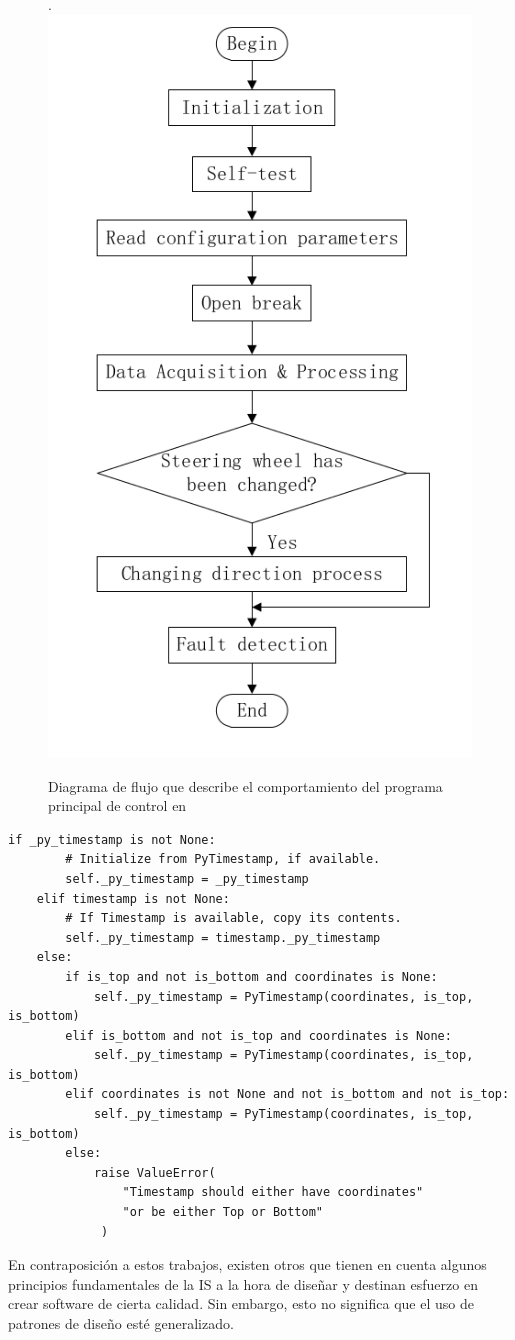 \begin{figure}[H]
	\centering
	\caption{Diagrama de flujo que describe el comportamiento del programa principal de control en \cite{bad-desing-auto}}.
	\label{flujo}
    \includegraphics[width=0.5\linewidth]{main_flujo.png}
\end{figure}

\begin{lstlisting}[caption=Extracto de código de \cite{code-2}.,label={ifanidados}]
 if _py_timestamp is not None:
        # Initialize from PyTimestamp, if available.
        self._py_timestamp = _py_timestamp
    elif timestamp is not None:
        # If Timestamp is available, copy its contents.
        self._py_timestamp = timestamp._py_timestamp
    else:
        if is_top and not is_bottom and coordinates is None:
            self._py_timestamp = PyTimestamp(coordinates, is_top, is_bottom)
        elif is_bottom and not is_top and coordinates is None:
            self._py_timestamp = PyTimestamp(coordinates, is_top, is_bottom)
        elif coordinates is not None and not is_bottom and not is_top:
            self._py_timestamp = PyTimestamp(coordinates, is_top, is_bottom)
        else:
            raise ValueError(
                "Timestamp should either have coordinates"
                "or be either Top or Bottom"
             )
\end{lstlisting}


En contraposición a estos trabajos, existen otros \cite{good-desing-agrobot,good-desing-street} que tienen en cuenta algunos principios fundamentales de la IS a la hora de diseñar y destinan esfuerzo en crear software de cierta calidad. Sin embargo, esto no significa que el uso de patrones de diseño esté generalizado.

